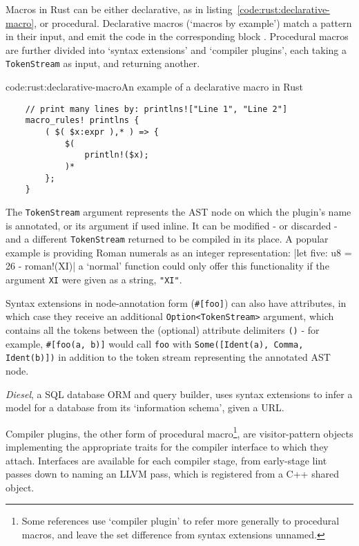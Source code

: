 Macros in Rust can be either declarative, as in listing~\ref{code:rust:declarative-macro}, or procedural. Declarative macros (`macros by example') match a pattern in their input, and emit the code in the corresponding block \cite{rust_macros_overview}. Procedural macros are further divided into `syntax extensions' and `compiler plugins', each taking a \texttt{TokenStream} as input, and returning another. \cite{rust_macros_whereweat}

\begin{codelisting}{code:rust:declarative-macro}{An example of a declarative macro in Rust}
\begin{verbatim}
	// print many lines by: printlns!["Line 1", "Line 2"]
	macro_rules! printlns {
		( $( $x:expr ),* ) => {
			$(
				println!($x);
			)*
		};
	}
\end{verbatim}	
\end{codelisting}

The \texttt{TokenStream} argument represents the AST node on which the plugin's name is annotated, or its argument if used inline. It can be modified - or discarded - and a different \texttt{TokenStream} returned to be compiled in its place. A popular example \cite{rust_macros_overview, rust_book} is providing Roman numerals as an integer representation: |let five: u8 = 26 - roman!(XI)| a `normal' function could only offer this functionality if the argument \texttt{XI} were given as a string, \texttt{"XI"}.

Syntax extensions in node-annotation form (\texttt{#[foo]}) can also have attributes, in which case they receive an additional \texttt{Option<TokenStream>} argument, which contains all the tokens between the (optional) attribute delimiters \texttt{()} - for example, \texttt{#[foo(a, b)]} would call \texttt{foo} with \texttt{Some([Ident(a), Comma, Ident(b)])} in addition to the token stream representing the annotated AST node. \cite{rust_rfc1566}

\emph{Diesel}, a SQL database ORM and query builder, uses syntax extensions to infer a model for a database from its `information schema', given a URL. \cite{rust_orm_diesel}

Compiler plugins, the other form of procedural macro\footnote{Some references \cite{rust_macros_overview} use `compiler plugin' to refer more generally to procedural macros, and leave the set difference from syntax extensions unnamed.}, are visitor-pattern objects implementing the appropriate traits for the compiler interface to which they attach. Interfaces are available for each compiler stage, from early-stage lint passes down to naming an LLVM pass, which is registered from a C++ shared object. \cite{rust_macro_registry, rust_tests_llvm_pass}

